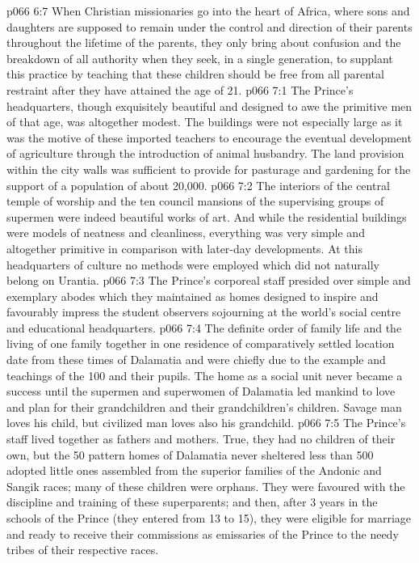 \vs p066 6:7 When Christian missionaries go into the heart of Africa, where sons and daughters are supposed to remain under the control and direction of their parents throughout the lifetime of the parents, they only bring about confusion and the breakdown of all authority when they seek, in a single generation, to supplant this practice by teaching that these children should be free from all parental restraint after they have attained the age of 21.
\vs p066 7:1 The Prince’s headquarters, though exquisitely beautiful and designed to awe the primitive men of that age, was altogether modest. The buildings were not especially large as it was the motive of these imported teachers to encourage the eventual development of agriculture through the introduction of animal husbandry. The land provision within the city walls was sufficient to provide for pasturage and gardening for the support of a population of about 20,000.
\vs p066 7:2 The interiors of the central temple of worship and the ten council mansions of the supervising groups of supermen were indeed beautiful works of art. And while the residential buildings were models of neatness and cleanliness, everything was very simple and altogether primitive in comparison with later\hyp{}day developments. At this headquarters of culture no methods were employed which did not naturally belong on Urantia.
\vs p066 7:3 The Prince’s corporeal staff presided over simple and exemplary abodes which they maintained as homes designed to inspire and favourably impress the student observers sojourning at the world’s social centre and educational headquarters.
\vs p066 7:4 \pc The definite order of family life and the living of one family together in one residence of comparatively settled location date from these times of Dalamatia and were chiefly due to the example and teachings of the 100 and their pupils. The home as a social unit never became a success until the supermen and superwomen of Dalamatia led mankind to love and plan for their grandchildren and their grandchildren’s children. Savage man loves his child, but civilized man loves also his grandchild.
\vs p066 7:5 The Prince’s staff lived together as fathers and mothers. True, they had no children of their own, but the 50 pattern homes of Dalamatia never sheltered less than 500 adopted little ones assembled from the superior families of the Andonic and Sangik races; many of these children were orphans. They were favoured with the discipline and training of these superparents; and then, after 3 years in the schools of the Prince (they entered from 13 to 15), they were eligible for marriage and ready to receive their commissions as emissaries of the Prince to the needy tribes of their respective races.
